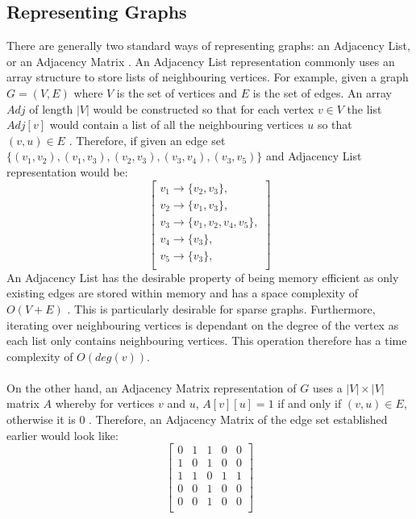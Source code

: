 \subsection{Representing Graphs}
There are generally two standard ways of representing graphs: an Adjacency List, or an Adjacency Matrix \cite{LewisR.M.R2015AGtG, IntroAlgs}. An Adjacency List representation commonly uses an array structure to store lists of neighbouring vertices. For example, given a graph $G = (V, E)$ where $V$ is the set of vertices and $E$ is the set of edges. An array $Adj$ of length $|V|$ would be constructed so that for each vertex $v \in V$ the list $Adj[v]$ would contain a list of all the neighbouring vertices $u$ so that $(v, u) \in E$ \cite{IntroAlgs}. Therefore, if given an edge set $\{(v_{1}, v_{2}), (v_{1}, v_{3}), (v_{2}, v_{3}), (v_{3}, v_{4}), (v_{3}, v_{5})\}$ and Adjacency List representation would be:
\begin{equation*}
     \begin{bmatrix}
    v_{1} \rightarrow \{v_{2}, v_{3}\}, \\
    v_{2} \rightarrow \{v_{1}, v_{3}\}, \\
    v_{3} \rightarrow \{v_{1}, v_{2}, v_{4}, v_{5}\}, \\
    v_{4} \rightarrow \{v_{3}\}, \\
    v_{5} \rightarrow \{v_{3}\}, \\
    \end{bmatrix} 
\end{equation*}
An Adjacency List has the desirable property of being memory efficient as only existing edges are stored within memory and has a space complexity of $O(V + E)$ \cite{IntroAlgs}. This is particularly desirable for sparse graphs. Furthermore, iterating over neighbouring vertices is dependant on the degree of the vertex as each list only contains neighbouring vertices. This operation therefore has a time complexity of $O(deg(v))$.
\\\\
On the other hand, an Adjacency Matrix representation of $G$ uses a $|V| \times |V|$ matrix $A$ whereby for vertices $v$ and $u$, $A[v][u] = 1$ if and only if $(v, u) \in E$, otherwise it is 0 \cite{IntroAlgs}.  Therefore, an Adjacency Matrix of the edge set established earlier would look like:
\begin{equation*}
     \begin{bmatrix}
     0 & 1 & 1 & 0 & 0 \\
     1 & 0 & 1 & 0 & 0 \\
     1 & 1 & 0 & 1 & 1 \\
     0 & 0 & 1 & 0 & 0 \\
     0 & 0 & 1 & 0 & 0 \\
    \end{bmatrix} 
\end{equation*}
